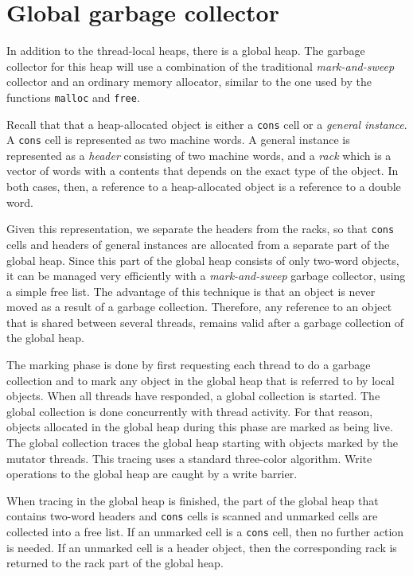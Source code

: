 \section{Global garbage collector}

In addition to the thread-local heaps, there is a global heap.  The
garbage collector for this heap will use a combination of the
traditional \emph{mark-and-sweep} collector and an ordinary memory
allocator, similar to the one used by the \clanguage{} functions
\texttt{malloc} and \texttt{free}.

Recall that that a heap-allocated object is either a \texttt{cons}
cell or a \emph{general instance}.  A \texttt{cons} cell is
represented as two machine words.  A general instance is represented
as a \emph{header} consisting of two machine words, and a \emph{rack}
which is a vector of words with a contents that depends on the exact
type of the object.  In both cases, then, a reference to a
heap-allocated object is a reference to a double word.

Given this representation, we separate the headers from the racks, so
that \texttt{cons} cells and headers of general instances are
allocated from a separate part of the global heap.  Since this part of
the global heap consists of only two-word objects, it can be managed
very efficiently with a \emph{mark-and-sweep} garbage collector, using
a simple free list.  The advantage of this technique is that an object
is never moved as a result of a garbage collection.  Therefore, any
reference to an object that is shared between several threads, remains
valid after a garbage collection of the global heap.

The marking phase is done by first requesting each thread to do a
garbage collection and to mark any object in the global heap that is
referred to by local objects.  When all threads have responded, a
global collection is started.  The global collection is done
concurrently with thread activity.  For that reason, objects allocated
in the global heap during this phase are marked as being live.
The global collection traces the global heap starting with objects
marked by the mutator threads.  This tracing uses a standard
three-color algorithm.  Write operations to the global heap are caught
by a write barrier.

When tracing in the global heap is finished, the part of the global
heap that contains two-word headers and \texttt{cons} cells is scanned
and unmarked cells are collected into a free list.  If an unmarked
cell is a \texttt{cons} cell, then no further action is needed.  If an
unmarked cell is a header object, then the corresponding rack is
returned to the rack part of the global heap.
